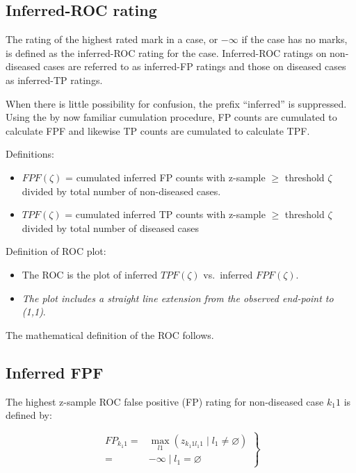 \documentclass[
]{book}
\providecommand{\tightlist}{%
  \setlength{\itemsep}{0pt}\setlength{\parskip}{0pt}}
\begin{document}
\hypertarget{inferred-roc-rating}{%
\subsection{Inferred-ROC rating}\label{inferred-roc-rating}}

The rating of the highest rated mark in a case, or \(-\infty\) if the case has no marks, is defined as the inferred-ROC rating for the case. Inferred-ROC ratings on non-diseased cases are referred to as inferred-FP ratings and those on diseased cases as inferred-TP ratings.

When there is little possibility for confusion, the prefix ``inferred'' is suppressed. Using the by now familiar cumulation procedure, FP counts are cumulated to calculate FPF and likewise TP counts are cumulated to calculate TPF.

Definitions:

\begin{itemize}
\tightlist
\item
  \(FPF(\zeta)\) = cumulated inferred FP counts with z-sample \(\geq\) threshold \(\zeta\) divided by total number of non-diseased cases.
\item
  \(TPF(\zeta)\) = cumulated inferred TP counts with z-sample \(\geq\) threshold \(\zeta\) divided by total number of diseased cases
\end{itemize}

Definition of ROC plot:

\begin{itemize}
\tightlist
\item
  The ROC is the plot of inferred \(TPF(\zeta)\) vs.~inferred \(FPF(\zeta)\).
\item
  \emph{The plot includes a straight line extension from the observed end-point to (1,1)}.
\end{itemize}

The mathematical definition of the ROC follows.

\hypertarget{inferred-fpf}{%
\subsection{Inferred FPF}\label{inferred-fpf}}

The highest z-sample ROC false positive (FP) rating for non-diseased case \(k_1 1\) is defined by:

\begin{equation}
\left.
\begin{aligned}
FP_{k_1 1}=&\max_{l1} \left ( z_{k_1 1 l_1 1 } \mid l_1 \neq \varnothing \right ) \\
=& -\infty \mid l_1 = \varnothing  
 \end{aligned}
\right \}
\label{eq:froc-empirical-FP}
\end{equation}
\end{document}

